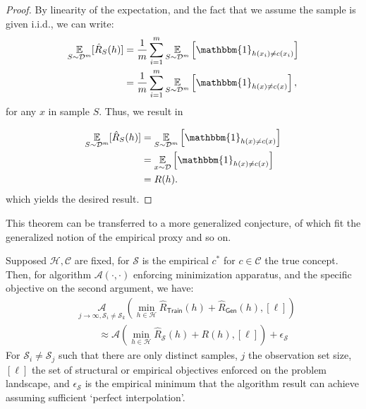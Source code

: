 \documentclass[
  journal=largetwo,
  year=2025,
  volume=37,
]{cup-journal}
\begin{document}
\begin{proof}
    By linearity of the expectation, and the fact that we assume the sample is given i.i.d., we can write: 
\begin{equation}
    \begin{split}
        \underset{S \sim \mathcal{D}^m}{\mathbb{E}}[\hat{R}_S(h)] 
        &= \frac{1}{m} \sum_{i=1}^m 
            \underset{S \sim \mathcal{D}^m}{\mathbb{E}} 
                    \left[ \mathbbm{1}_{h(x_i) \ne c(x_i)} \right] \\
        &= \frac{1}{m} \sum_{i=1}^m 
            \underset{S \sim \mathcal{D}^m}{\mathbb{E}} 
                \left[ \mathbbm{1}_{h(x) \ne c(x)} \right], \\
    \end{split}
\end{equation}
for any \( x \) in sample \( S \). Thus, we result in

\begin{equation}
    \begin{split}
        \underset{S \sim \mathcal{D}^m}{\mathbb{E}}[\hat{R}_S(h)] 
            &= \underset{S \sim \mathcal{D}^m}{\mathbb{E}} 
            \left[ \mathbbm{1}_{h(x) \ne c(x)} \right] \\
            &= \underset{x \sim \mathcal{D}}{\mathbb{E}} 
            \left[ \mathbbm{1}_{h(x) \ne c(x)} \right] \\
            &= R(h).
    \end{split}
\end{equation}
which yields the desired result. 
\end{proof}

This theorem can be transferred to a more generalized conjecture, of which fit the generalized notion of the empirical proxy and so on. 
\begin{conjecture}
    Supposed $\mathcal{H},\mathcal{C}$ are fixed, for $\mathcal{S}$ is the empirical $c^{*}$ for $c\in \mathcal{C}$ the true concept. Then, for algorithm $\mathcal{A}(\cdot,\cdot)$ enforcing minimization apparatus, and the specific objective on the second argument, we have:
    \begin{equation}
        \begin{split}
            &\underset{j\to\infty,\mathcal{S}_{i}\neq\mathcal{S}_{k}}{\mathcal{A}}\left(\min_{h\in\mathcal{H}} \hat{R}_{\mathsf{Train}}(h) + \hat{R}_{\mathsf{Gen}}(h), [\ell]\right)\\
            & \quad \quad \approx \mathcal{A}\left(\min_{h\in\mathcal{H}} \hat{R}_{\mathcal{S}}(h) + R(h), [\ell]\right) + \epsilon_{\mathcal{S}}
        \end{split}
    \end{equation}
    For $\mathcal{S}_{i}\neq\mathcal{S}_{j}$ such that there are only distinct samples, $j$ the observation set size, $[\ell]$ the set of structural or empirical objectives enforced on the problem landscape, and $\epsilon_{\mathcal{S}}$ is the empirical minimum that the algorithm result can achieve assuming sufficient `perfect interpolation'. 
\end{conjecture}
\end{document}
